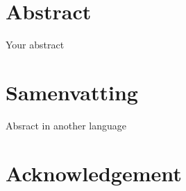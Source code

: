 \chapter*{Abstract}
\thispagestyle{empty} %
Your abstract

\thispagestyle{empty}
\chapter*{Samenvatting}
Absract in another language


\chapter*{Acknowledgement}
\thispagestyle{empty}